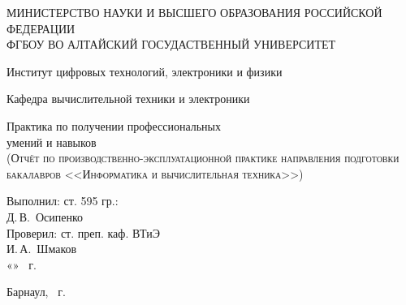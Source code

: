 \documentclass[a4paper, 12pt]{article}
\begin{document}
\begin{titlepage}
  \begin{center}
    \MakeUppercase{Министерство науки и высшего образования Российской Федерации} \\
    \MakeUppercase{ФГБОУ ВО Алтайский госудаственный университет}
    \vspace{0.25cm}
    
	  Институт цифровых технологий, электроники и физики
    
    Кафедра вычислительной техники и электроники
    \vfill
    
    {\LARGE Практика по получении профессиональных\\ умений и навыков}\\[5mm]
    \textsc{(Отчёт по производственно-эксплуатационной практике направления подготовки бакалавров <<Информатика и вычислительная техника>>)}
  \bigskip

\end{center}
\vfill

\newlength{\ML}
\hfill
\begin{minipage}{0.45\textwidth}
  Выполнил: ст. 595 гр.:\\
  \underline{\hspace{\ML}} Д.\,В.~Осипенко\\
  Проверил: ст. преп. каф. ВТиЭ\\
  \underline{\hspace{\ML}} И.\,А.~Шмаков\\
  «\underline{\hspace{0.7cm}}» \underline{\hspace{2cm}} \the\year~г.
\end{minipage}%
\vfill

\begin{center}
  Барнаул, \the\year~г.
\end{center}
\end{titlepage}

\newpage

\tableofcontents 
\newpage

\setcounter{section}{-1}
\end{document}
